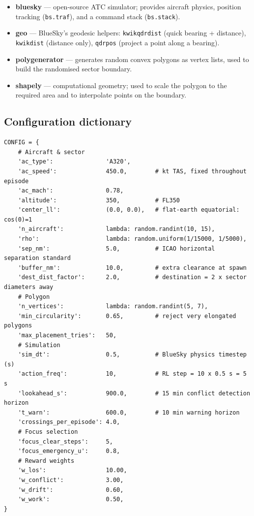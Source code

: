 \documentclass[11pt, a4paper]{article}
\begin{document}
\begin{itemize}[noitemsep]
  \item \textbf{bluesky} --- open-source ATC simulator; provides aircraft
        physics, position tracking (\texttt{bs.traf}), and a command stack
        (\texttt{bs.stack}).
  \item \textbf{geo} --- BlueSky's geodesic helpers: \texttt{kwikqdrdist}
        (quick bearing + distance), \texttt{kwikdist} (distance only),
        \texttt{qdrpos} (project a point along a bearing).
  \item \textbf{polygenerator} --- generates random convex polygons as vertex
        lists, used to build the randomised sector boundary.
  \item \textbf{shapely} --- computational geometry; used to scale the polygon
        to the required area and to interpolate points on the boundary.
\end{itemize}

\subsection{Configuration dictionary}

\begin{lstlisting}[caption={The \texttt{CONFIG} dictionary --- all tuneable parameters
in one place. Lambda values are re-sampled fresh each episode.}]
CONFIG = {
    # Aircraft & sector
    'ac_type':               'A320',
    'ac_speed':              450.0,        # kt TAS, fixed throughout episode
    'ac_mach':               0.78,
    'altitude':              350,          # FL350
    'center_ll':             (0.0, 0.0),   # flat-earth equatorial: cos(0)=1
    'n_aircraft':            lambda: random.randint(10, 15),
    'rho':                   lambda: random.uniform(1/15000, 1/5000),
    'sep_nm':                5.0,          # ICAO horizontal separation standard
    'buffer_nm':             10.0,         # extra clearance at spawn
    'dest_dist_factor':      2.0,          # destination = 2 x sector diameters away
    # Polygon
    'n_vertices':            lambda: random.randint(5, 7),
    'min_circularity':       0.65,         # reject very elongated polygons
    'max_placement_tries':   50,
    # Simulation
    'sim_dt':                0.5,          # BlueSky physics timestep (s)
    'action_freq':           10,           # RL step = 10 x 0.5 s = 5 s
    'lookahead_s':           900.0,        # 15 min conflict detection horizon
    't_warn':                600.0,        # 10 min warning horizon
    'crossings_per_episode': 4.0,
    # Focus selection
    'focus_clear_steps':     5,
    'focus_emergency_u':     0.8,
    # Reward weights
    'w_los':                 10.00,
    'w_conflict':            3.00,
    'w_drift':               0.60,
    'w_work':                0.50,
}
\end{lstlisting}
\end{document}
